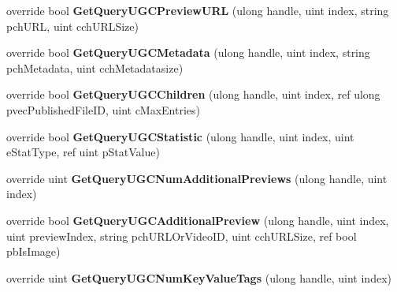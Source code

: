 \begin{DoxyCompactItemize}
\item 
\hypertarget{classValve_1_1Steamworks_1_1CSteamUGC_a16ae25070d63171cb6111a4bfb0f6f39}{}override bool {\bfseries Get\+Query\+U\+G\+C\+Preview\+U\+R\+L} (ulong handle, uint index, string pch\+U\+R\+L, uint cch\+U\+R\+L\+Size)\label{classValve_1_1Steamworks_1_1CSteamUGC_a16ae25070d63171cb6111a4bfb0f6f39}

\item 
\hypertarget{classValve_1_1Steamworks_1_1CSteamUGC_ae91dacdca1eadf059c3c14d1af40c81d}{}override bool {\bfseries Get\+Query\+U\+G\+C\+Metadata} (ulong handle, uint index, string pch\+Metadata, uint cch\+Metadatasize)\label{classValve_1_1Steamworks_1_1CSteamUGC_ae91dacdca1eadf059c3c14d1af40c81d}

\item 
\hypertarget{classValve_1_1Steamworks_1_1CSteamUGC_a9de94fba378c9d031513e383917768d7}{}override bool {\bfseries Get\+Query\+U\+G\+C\+Children} (ulong handle, uint index, ref ulong pvec\+Published\+File\+I\+D, uint c\+Max\+Entries)\label{classValve_1_1Steamworks_1_1CSteamUGC_a9de94fba378c9d031513e383917768d7}

\item 
\hypertarget{classValve_1_1Steamworks_1_1CSteamUGC_ac49fcf6e25f6e44aca00ae73efeed5d1}{}override bool {\bfseries Get\+Query\+U\+G\+C\+Statistic} (ulong handle, uint index, uint e\+Stat\+Type, ref uint p\+Stat\+Value)\label{classValve_1_1Steamworks_1_1CSteamUGC_ac49fcf6e25f6e44aca00ae73efeed5d1}

\item 
\hypertarget{classValve_1_1Steamworks_1_1CSteamUGC_a110bca0f5aa43600d27a29c2434129b3}{}override uint {\bfseries Get\+Query\+U\+G\+C\+Num\+Additional\+Previews} (ulong handle, uint index)\label{classValve_1_1Steamworks_1_1CSteamUGC_a110bca0f5aa43600d27a29c2434129b3}

\item 
\hypertarget{classValve_1_1Steamworks_1_1CSteamUGC_a2eb00081fad2ac301e0e9e008881e4ef}{}override bool {\bfseries Get\+Query\+U\+G\+C\+Additional\+Preview} (ulong handle, uint index, uint preview\+Index, string pch\+U\+R\+L\+Or\+Video\+I\+D, uint cch\+U\+R\+L\+Size, ref bool pb\+Is\+Image)\label{classValve_1_1Steamworks_1_1CSteamUGC_a2eb00081fad2ac301e0e9e008881e4ef}

\item 
\hypertarget{classValve_1_1Steamworks_1_1CSteamUGC_a994948972c0c105e0a84abb68649104e}{}override uint {\bfseries Get\+Query\+U\+G\+C\+Num\+Key\+Value\+Tags} (ulong handle, uint index)\label{classValve_1_1Steamworks_1_1CSteamUGC_a994948972c0c105e0a84abb68649104e}


\end{DoxyCompactItemize}
